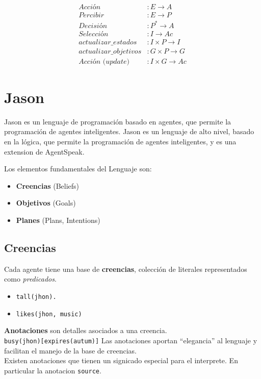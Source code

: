 \begin{align}
   \textit{Acción} & : E \rightarrow A \\
   \textit{Percibir} & : E \rightarrow P\\
   \textit{Decisión} & : P^* \rightarrow A\\
   \textit{Selección} & : I \rightarrow Ac \\
   \textit{actualizar\_estados} & : I \times P \rightarrow I\\
   \textit{actualizar\_objetivos} & : G \times P \rightarrow G \\
   \textit{Acción (update)} & : I \times G \rightarrow Ac
\end{align}

\section{Jason}

Jason es un lenguaje de programación basado en agentes, que permite la programación de agentes inteligentes. Jason es un lenguaje de alto nivel, basado en la lógica, que permite la programación de agentes inteligentes, y es una extension de AgentSpeak.

{Los elementos fundamentales del Lenguaje son:\ns
\begin{itemize}
	\item \textbf{Creencias} (Beliefs)
	\item \textbf{Objetivos} (Goals)
	\item \textbf{Planes} (Plans, Intentions)
\end{itemize} }


\subsection{Creencias}
{Cada agente tiene una base de \textbf{creencias}, colección de literales representados como \textit{predicados}.\ns
\begin{itemize}
	\item \lstinline|tall(jhon).|
	\item \lstinline|likes(jhon, music)|
\end{itemize}}
\textbf{Anotaciones} son detalles asociados a una creencia.\\\lstinline|busy(jhon)[expires(autum)]|
Las anotaciones aportan ``elegancia'' al lenguaje y facilitan el manejo de la base de creencias.\\
Existen anotaciones que tienen un signicado especial para el
interprete. En particular la anotacion \lstinline|source|.

